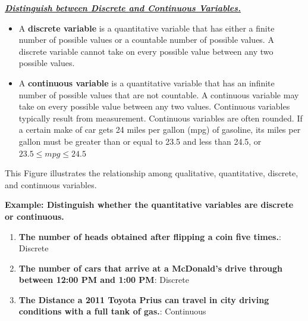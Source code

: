 \documentclass{report}
\begin{document}
        \bigbreak \noindent 
        \textbf{\textit{\underline{Distinguish between Discrete and Continuous Variables.}}}
        \begin{itemize}
            \item A \textbf{discrete variable} is a quantitative variable that has either a finite number of possible values or a countable number of possible values. A discrete variable cannot take on every possible value between any two possible values.
            \item A \textbf{continuous variable} is a quantitative variable that has an infinite number of possible values that are not countable. A continuous variable may take on every possible value between any two values. Continuous variables typically result from measurement. Continuous variables are often rounded. If a certain make of car gets 24 miles per gallon (mpg) of gasoline, its miles per gallon must be greater than or equal to 23.5 and less than 24.5, or $23.5 \leq mpg \leq 24.5$
        \end{itemize}

        \bigbreak \noindent 
        This Figure illustrates the relationship among qualitative, quantitative, discrete, and continuous variables.

        \begin{figure}[ht]
            \centering
            \label{fig:graph1}
        \end{figure}

        \bigbreak \noindent 
        \begin{mdframed}
          \textbf{Example: Distinguish whether the quantitative variables are discrete or continuous.}
          \begin{enumerate}[label=\alph*.)]
            \item \textbf{The number of heads obtained after flipping a coin five times.}: Discrete
            \item \textbf{The number of cars that arrive at a McDonald's drive through between 12:00 PM and 1:00 PM}: Discrete
            \item \textbf{The Distance a 2011 Toyota Prius can travel in city driving conditions with a full tank of gas.}: Continuous
          \end{enumerate}
        \end{mdframed}
\end{document}
